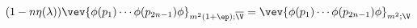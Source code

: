 \begin{equation}
(1 - n \eta (\lambda)) \vev{ \phi (p_1) \cdots \phi (p_{2n-1}) \phi
}_{m^2 (1+\ep); \overline{\V}} = \vev{ \phi (p_1) \cdots \phi
(p_{2n-1}) \phi }_{m^2; \V} \label{intermediate}
\end{equation}

